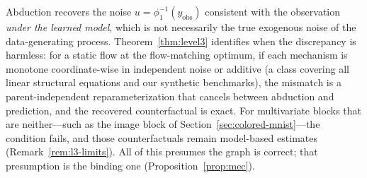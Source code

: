 \begin{remark}
\label{rem:cf-identifiability}
Abduction recovers the noise $u = \phi_1^{-1}(y_{\mathrm{obs}})$ consistent with the observation \emph{under the learned model}, which is not necessarily the true exogenous noise of the data-generating process. Theorem~\ref{thm:level3} identifies
when the discrepancy is harmless: for a static flow at the flow-matching optimum, if each mechanism is monotone coordinate-wise in independent noise or additive (a class covering all linear structural equations and our synthetic benchmarks), the mismatch is a parent-independent reparameterization that cancels
between abduction and prediction, and the recovered counterfactual is exact. For multivariate blocks that are neither---such as the image block of Section~\ref{sec:colored-mnist}---the condition fails, and those counterfactuals
remain model-based estimates (Remark~\ref{rem:l3-limits}). All of this presumes the graph is
correct; that presumption is the binding one (Proposition~\ref{prop:mec}).
\end{remark}
